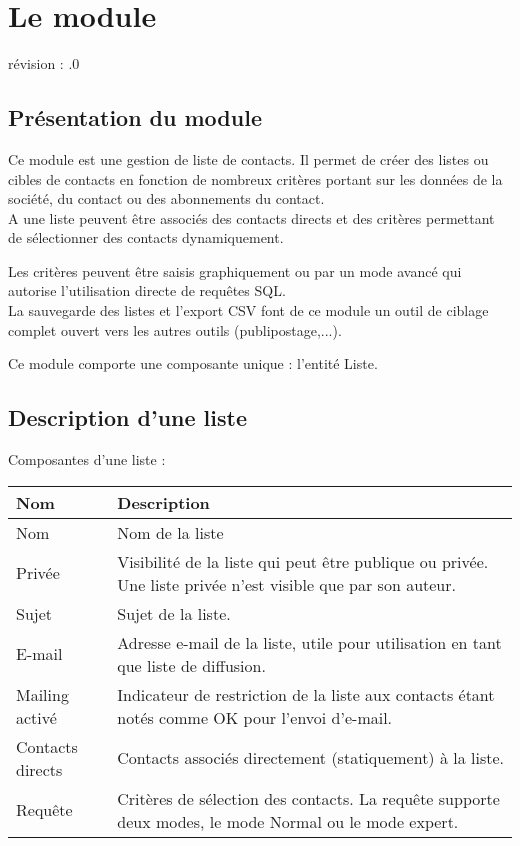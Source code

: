 
\clearpage
\section{Le module \List}

révision : .0

\subsection{Présentation du module \List}

Ce module est une gestion de liste de contacts.
Il permet de créer des listes ou cibles de contacts en fonction de nombreux critères portant sur les données de la société, du contact ou des abonnements du contact.\\

A une liste peuvent être associés des contacts directs et des critères permettant de sélectionner des contacts dynamiquement.

Les critères peuvent être saisis graphiquement ou par un mode avancé qui autorise l'utilisation directe de requêtes SQL.\\

La sauvegarde des listes et l'export CSV font de ce module un outil de ciblage complet ouvert vers les autres outils (publipostage,...).

Ce module comporte une composante unique : l'entité Liste.


\subsection{Description d'une liste}

Composantes d'une liste :\\

\begin{tabular}{|p{3cm}|p{10cm}|}
\hline
\textbf{Nom} & \textbf{Description} \\
\hline
Nom & Nom de la liste \\
\hline
Privée & Visibilité de la liste qui peut être publique ou privée. Une liste privée n'est visible que par son auteur.\\
\hline
Sujet & Sujet de la liste.\\
\hline
E-mail & Adresse e-mail de la liste, utile pour utilisation en tant que liste de diffusion.\\
\hline
Mailing activé & Indicateur de restriction de la liste aux contacts étant notés comme OK pour l'envoi d'e-mail.\\
\hline
Contacts directs & Contacts associés directement (statiquement) à la liste.\\
\hline
Requête & Critères de sélection des contacts. La requête supporte deux modes, le mode Normal ou le mode expert.\\
\hline
\end{tabular}



